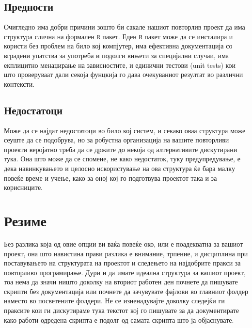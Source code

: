 \documentclass[
]{book}
\begin{document}
\hypertarget{ux43fux440ux435ux434ux43dux43eux441ux442ux438-1}{%
\subsection{Предности}\label{ux43fux440ux435ux434ux43dux43eux441ux442ux438-1}}

Очигледно има добри причини зошто би сакале нашиот повторлив проект да има структура слична на формален \texttt{R} пакет. Еден \texttt{R} пакет може да се инсталира и користи без проблем на било кој компјутер, има ефективна документација со вградени упатства за употреба и подолги вињети за специјални случаи, има екплицитно менаџирање на зависностите, и единични тестови (unit tests) кои што проверуваат дали секоја фунцкија го дава очекуваниот резултат во различни контексти.

\hypertarget{ux43dux435ux434ux43eux441ux442ux430ux442ux43eux446ux438-1}{%
\subsection{Недостатоци}\label{ux43dux435ux434ux43eux441ux442ux430ux442ux43eux446ux438-1}}

Може да се најдат недостатоци во било кој систем, и секако оваа структура може сеуште да се подобрува, но за робустна организација на вашите повторливи проекти веројатно треба да се држите до некоја од алтернативите дискутирани тука. Она што може да се спомене, не како недостаток, туку предупредување, е дека навинкувањето и целосно искористување на ова структура ќе бара малку повеќе време и учење, како за оној кој го подготвува проектот така и за корисниците.

\hypertarget{ux440ux435ux437ux438ux43cux435-4}{%
\section{Резиме}\label{ux440ux435ux437ux438ux43cux435-4}}

Без разлика која од овие опции ви ваќа повеќе око, или е поадекватна за вашиот проект, она што навистина прави разлика е внимание, трпение, и дисциплина при поставувањето на структурата на проектот и следењето на најдобрите пракси за повторливо програмирање. Дури и да имате идеална структура за вашиот проект, тоа нема да значи ништо доколку на вториот работен ден почнете да пишувате скрипти без документација или почнете да зачувувате фајлови во главниот фолдер наместо во посветените фолдери. Не се изненадувајте доколку следејќи ги праксите кои ги дискутираме тука текстот кој го пишувате за да документирате како работи одредена скрипта е подолг од самата скрипта што ја објаснувате.
\end{document}
